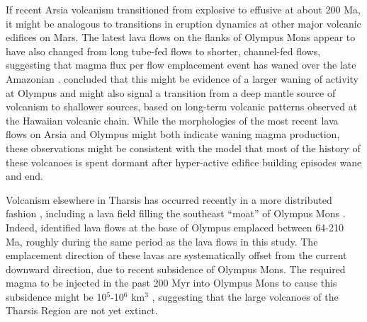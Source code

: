 \documentclass[12pt,letter]{article}
\begin{document}
If recent Arsia volcanism transitioned from explosive to effusive at about 200 Ma, it might be analogous to transitions in eruption dynamics at other major volcanic edifices on Mars. The latest lava flows on the flanks of Olympus Mons appear to have also changed from long tube-fed flows to shorter, channel-fed flows, suggesting that magma flux per flow emplacement event has waned over the late Amazonian \citep{bleacher2007olympus}. \citet{bleacher2007olympus} concluded that this might be evidence of a larger waning of activity at Olympus and might also signal a transition from a deep mantle source of volcanism to shallower sources, based on long-term volcanic patterns observed at the Hawaiian volcanic chain. While the morphologies of the most recent lava flows on Arsia and Olympus might both indicate waning magma production, these observations might be consistent with the \citet{wilson2001evidence} model that most of the history of these volcanoes is spent dormant after hyper-active edifice building episodes wane and end.

Volcanism elsewhere in Tharsis has occurred recently in a more distributed fashion \citep{hauber2011very}, including a lava field filling the southeast ``moat'' of Olympus Mons \citep{chadwick2015late}. Indeed, \citet{chadwick2015late} identified lava flows at the base of Olympus emplaced between 64-210 Ma, roughly during the same period as the lava flows in this study. The emplacement direction of these lavas are systematically offset from the current downward direction, due to recent subsidence of Olympus Mons. The required magma to be injected in the past 200 Myr into Olympus Mons to cause this subsidence might be 10$^5$-10$^6$ km$^3$ \citep{chadwick2015late}, suggesting that the large volcanoes of the Tharsis Region are not yet extinct.






\end{document}
